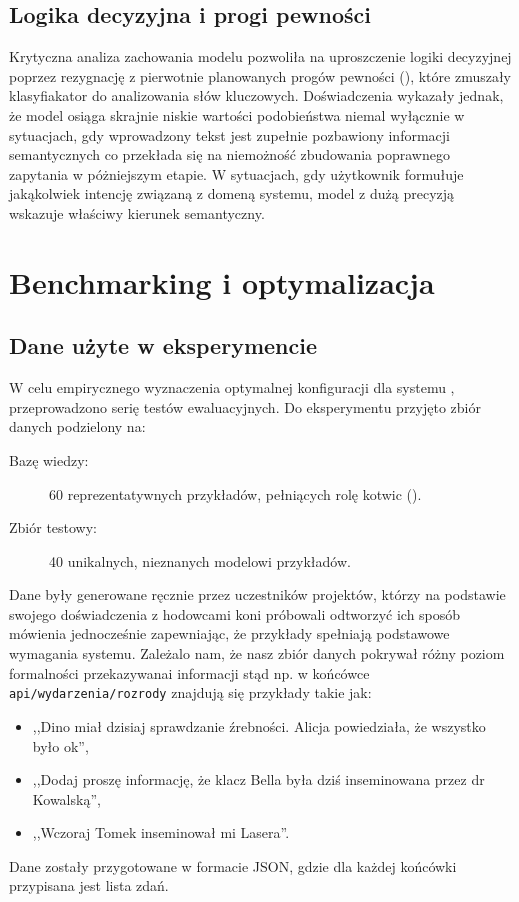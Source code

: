 \subsection*{Logika decyzyjna i progi pewności}

Krytyczna analiza zachowania modelu pozwoliła na uproszczenie logiki decyzyjnej poprzez rezygnację z pierwotnie planowanych progów pewności (), które zmuszały klasyfiakator do analizowania słów kluczowych. Doświadczenia wykazały jednak, że model osiąga skrajnie niskie wartości podobieństwa niemal wyłącznie w sytuacjach, gdy wprowadzony tekst jest zupełnie pozbawiony informacji semantycznych co przekłada się na niemożność zbudowania poprawnego zapytania w póżniejszym etapie. W sytuacjach, gdy użytkownik formułuje jakąkolwiek intencję związaną z domeną systemu, model z dużą precyzją wskazuje właściwy kierunek semantyczny.

\section{Benchmarking i optymalizacja}

\subsection{Dane użyte w eksperymencie}

W celu empirycznego wyznaczenia optymalnej konfiguracji dla systemu , przeprowadzono serię testów ewaluacyjnych. Do eksperymentu przyjęto zbiór danych podzielony na:
\begin{description}
	\item[Bazę wiedzy:] 60 reprezentatywnych przykładów, pełniących rolę kotwic ().
	\item[Zbiór testowy:] 40 unikalnych, nieznanych modelowi przykładów.
\end{description}

Dane były generowane ręcznie przez uczestników projektów, którzy na podstawie swojego doświadczenia z hodowcami koni próbowali odtworzyć ich sposób mówienia jednocześnie zapewniając, że przykłady spełniają podstawowe wymagania systemu. Zależalo nam, że nasz zbiór danych pokrywał różny poziom formalności przekazywanai informacji stąd np. w końcówce \texttt{api/wydarzenia/\allowbreak{}rozrody} znajdują się przykłady takie jak:

\begin{itemize}
    \item ,,Dino miał dzisiaj sprawdzanie źrebności. Alicja powiedziała, że wszystko było ok'',
    \item ,,Dodaj proszę informację, że klacz Bella była dziś inseminowana przez dr Kowalską'',
    \item ,,Wczoraj Tomek inseminował mi Lasera''.
\end{itemize}
Dane zostały przygotowane w formacie JSON, gdzie dla każdej końcówki przypisana jest lista zdań.

